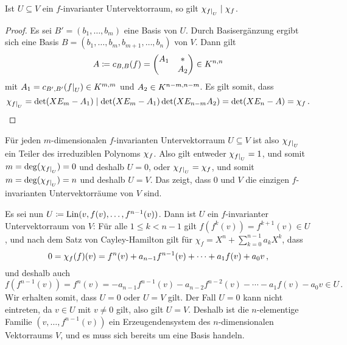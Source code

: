 \begin{lemma}
  Ist $U \subseteq V$ ein $f$-invarianter Untervektorraum, so gilt $\charpol{\restrict{f}{U}} \divides \charpol{f}$.
\end{lemma}

\begin{proof}
  Es sei $B' = (b_1, \dotsc, b_m)$ eine Basis von $U$.
  Durch Basisergänzung ergibt sich eine Basis $B = (b_1, \dotsc, b_m, b_{m+1}, \dotsc, b_n)$ von $V$.
  Dann gilt
  \[
              A
    \defined  \repmatrixendo{f}{B}
    =         \begin{pmatrix}
                A_1 & *   \\
                    & A_2
              \end{pmatrix}
    \in       \matrices{n}{K}
  \]
  mit $A_1 = \repmatrixendo{\restrict{f}{U}}{B'} \in \matrices{m}{K}$ und $A_2 \in \matrices{n-m}{K}$.
  Es gilt somit, dass
  \[
              \charpol{\restrict{f}{U}}
    =         \det(X E_m - A_1)
    \divides  \det(X E_m - A_1) \det(X E_{n-m} A_2)
    =         \det(X E_n - A)
    =         \charpol{f} \,.
  \]
\end{proof}

Für jeden $m$-dimensionalen $f$-invarianten Untervektorraum $U \subseteq V$ ist also $\charpol{\restrict{f}{U}}$ ein Teiler des irreduziblen Polynoms $\charpol{f}$.
Also gilt entweder $\charpol{\restrict{f}{U}} = 1$, und somit $m = \deg(\charpol{\restrict{f}{U}}) = 0$ und deshalb $U = 0$, oder $\charpol{\restrict{f}{U}} = \charpol{f}$, und somit $m = \deg(\charpol{\restrict{f}{U}}) = n$ und deshalb $U = V$.
Das zeigt, dass $0$ und $V$ die einzigen $f$-invarianten Untervektorräume von $V$ sind.

Es sei nun $U \defined \Lin(v, f(v), \dotsc, f^{n-1}(v))$.
Dann ist $U$ ein $f$-invarianter Untervektorraum von $V$:
Für alle $1 \leq k < n-1$ gilt $f(f^k(v)) = f^{k+1}(v) \in U$, und nach dem Satz von Cayley-Hamilton gilt für $\chi_f = X^n + \sum_{k=0}^{n-1} a_k X^k$, dass
\[
    0
  = \charpol{f}(f)(v)
  = f^n(v) + a_{n-1} f^{n-1}(v) + \dotsb + a_1 f(v) + a_0 v \,,
\]
und deshalb auch
\[
    f(f^{n-1}(v))
  = f^n(v)
  = - a_{n-1} f^{n-1}(v) - a_{n-2} f^{n-2}(v) - \dotsb - a_1 f(v) - a_0 v
  \in U \,.
\]
Wir erhalten somit, dass $U = 0$ oder $U = V$ gilt.
Der Fall $U = 0$ kann nicht eintreten, da $v \in U$ mit $v \neq 0$ gilt, also gilt $U = V$.
Deshalb ist die $n$-elementige Familie $(v, \dotsc, f^{n-1}(v))$ ein Erzeugendensystem des $n$-dimensionalen Vektorraums $V$, und es muss sich bereits um eine Basis handeln.




